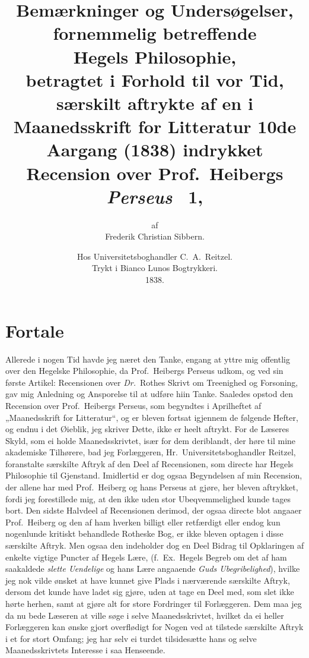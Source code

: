 \documentclass[12pt,a4paper]{book}
\title{\textbf{Bemærkninger og Undersøgelser,}\\[6pt]
  \large fornemmelig betreffende\\[6pt]
  \Large\textbf{Hegels Philosophie,}\\[6pt]
  \large betragtet i Forhold til vor Tid,\\[10pt]
  \normalsize særskilt aftrykte af en i Maanedsskrift for Litteratur
  10de Aargang (1838) indrykket Recension over Prof.\ Heibergs \emph{Perseus} \textnumero~1,}
\author{af\\[4pt] Frederik Christian Sibbern.}
\date{Hos Universitetsboghandler C.\ A.\ Reitzel.\\
  Trykt i Bianco Lunos Bogtrykkeri.\\[4pt]
  1838.}
\begin{document}
\maketitle
\thispagestyle{empty}
\newpage

\chapter*{Fortale}
\thispagestyle{plain}

Allerede i nogen Tid havde jeg næret den Tanke, engang at yttre mig
offentlig over den Hegelske Philosophie, da Prof.\ Heibergs Perseus
udkom, og ved sin første Artikel: Recensionen over \textit{Dr.}\ Rothes Skrivt
om Treenighed og Forsoning, gav mig Anledning og Ansporelse til at
udføre hiin Tanke. Saaledes opstod den Recension over Prof.\ Heibergs
Perseus, som begyndtes i Aprilheftet af „Maanedsskrift for Litteratur“,
og er bleven fortsat igjennem de følgende Hefter, og endnu i det
Øieblik, jeg skriver Dette, ikke er heelt aftrykt. For de Læseres Skyld,
som ei holde Maanedsskrivtet, især for dem deriblandt, der høre til mine
akademiske Tilhørere, bad jeg Forlæggeren, Hr.\ Universitetsboghandler
Reitzel, foranstalte særskilte Aftryk af den Deel af Recensionen, som
directe har Hegels Philosophie til Gjenstand. Imidlertid er dog ogsaa
Begyndelsen af min Recension, der allene har med Prof.\ Heiberg og hans
Perseus at gjøre, her bleven aftrykket, fordi jeg forestillede mig, at
den ikke uden stor Ubeqvemmelighed kunde tages bort. Den sidste Halvdeel
af Recensionen derimod, der ogsaa directe blot angaaer Prof.\ Heiberg og
den af ham hverken billigt eller retfærdigt eller endog kun nogenlunde
kritiskt behandlede Rotheske Bog, er ikke bleven optagen i disse
særskilte Aftryk. Men ogsaa den indeholder dog en Deel Bidrag til
Opklaringen af enkelte vigtige Puncter af Hegels Lære, (f.\ Ex.\ Hegels
Begreb om det af ham saakaldede \emph{slette Uendelige} og hans Lære angaaende
\emph{Guds Ubegribelighed}), hvilke jeg nok vilde ønsket at have kunnet give
Plads i nærværende særskilte Aftryk, dersom det kunde have ladet sig
gjøre, uden at tage en Deel med, som slet ikke hørte herhen, samt at
gjøre alt for store Fordringer til Forlæggeren. Dem maa jeg da nu bede
Læseren at ville søge i selve Maanedsskrivtet, hvilket da ei heller
Forlæggeren kan ønske gjort overflødigt for Nogen ved at tilstede
særskilte Aftryk i et for stort Omfang; jeg har selv ei turdet
tilsidesætte hans og selve Maanedsskrivtets Interesse i saa Henseende.
\end{document}
